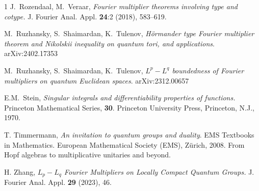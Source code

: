 \documentclass[a4paper,12pt]{amsart}
\numberwithin{equation}{section}
\theoremstyle{definition}
\begin{document}
\begin{thebibliography}{1}
  J.~Rozendaal,  M.~Veraar, \textit{Fourier multiplier theorems involving type and cotype.} J. Fourier Anal. Appl. \textbf{24}:2 (2018), 583--619.

  M.~Ruzhansky, S.~Shaimardan, K.~Tulenov, \textit{H\"ormander type Fourier multiplier theorem and Nikolskii inequality on quantum tori, and applications}. 	arXiv:2402.17353

  M.~Ruzhansky, S.~Shaimardan, K.~Tulenov, \textit{$L^p-L^q$ boundedness of Fourier multipliers on quantum Euclidean spaces}. 	arXiv:2312.00657

 E.M.~Stein, \textit{Singular integrals and differentiability properties of functions.} Princeton Mathematical Series, \textbf{30}. Princeton University Press, Princeton, N.J., 1970.

 T. Timmermann, \textit{An invitation to quantum groups and duality}. EMS Textbooks in Mathematics. European Mathematical Society (EMS), Zürich, 2008. From Hopf algebras to multiplicative unitaries and beyond.

 H. Zhang, \textit{$L_p-L_q$ Fourier Multipliers on Locally Compact Quantum Groups.} J. Fourier Anal. Appl. \textbf{29} (2023), 46.
\end{thebibliography}

\end{document}
